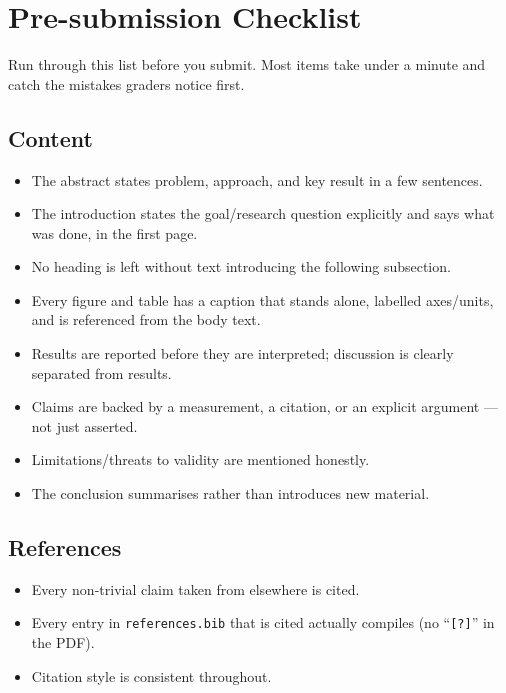 \section{Pre-submission Checklist}
\label{sec:checklist}

Run through this list before you submit. Most items take under a minute
and catch the mistakes graders notice first.

\subsection*{Content}
\begin{itemize}[nosep]
      \item[$\square$] The abstract states problem, approach, and key
            result in a few sentences.
      \item[$\square$] The introduction states the goal/research question
            explicitly and says what was done, in the first page.
      \item[$\square$] No heading is left without text introducing the
      following subsection.     
      \item[$\square$] Every figure and table has a caption that stands
            alone, labelled axes/units, and is referenced from the body
            text.
      \item[$\square$] Results are reported before they are interpreted;
            discussion is clearly separated from results.
      \item[$\square$] Claims are backed by a measurement, a citation, or an
            explicit argument --- not just asserted.
      \item[$\square$] Limitations/threats to validity are mentioned
            honestly.
      \item[$\square$] The conclusion summarises rather than introduces new
            material.
\end{itemize}

\subsection*{References}
\begin{itemize}[nosep]
      \item[$\square$] Every non-trivial claim taken from elsewhere is
            cited.
      \item[$\square$] Every entry in \texttt{references.bib} that is
            cited actually compiles (no ``\texttt{[?]}'' in the PDF).
      \item[$\square$] Citation style is consistent throughout.
\end{itemize}

